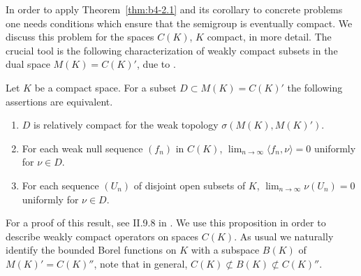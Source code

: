 In order to apply Theorem~\ref{thm:b4-2.1} and its corollary to concrete problems one
needs conditions which ensure that the semigroup is eventually compact.
We discuss this problem for the spaces $C(K)$, $K$ compact, in
more detail.
The crucial tool is the following characterization of
weakly compact subsets in the dual space $M(K) = C(K)'$, due to
\textcite{grothendieck:1953}.

\begin{proposition}\label{prop:b4-2.3}
	Let $K$ be a compact space.
	For a subset $D \subset M(K) = C(K)'$ the following assertions are equivalent.
	
	\begin{enumerate}[\upshape (a)]
		\item 
		$D$ is relatively compact for the weak topology $\sigma(M(K),M(K)')$.
	
		\item 
		For each weak null sequence $(f_n)$ in $C(K)$, $\lim_{n\to\infty}\langle f_n,\nu \rangle = 0$ uniformly for $\nu \in D$.
	
		\item 
		For each sequence $(U_n)$ of disjoint open subsets of\/ $K$, 
		$\lim_{n\to\infty}\nu(U_n) = 0$ uniformly for $\nu \in D$.
		\end{enumerate}
\end{proposition}
For a proof of this result, see \eg II.9.8 in \textcite{schaefer:1974}.
We use this proposition in order to describe weakly compact operators on spaces $C(K)$.
As usual we naturally identify the bounded Borel functions on $K$ with a subspace $B(K)$ of\/ $M(K)' = C(K)''$, note that in
general, $C(K) \not\subset B(K) \not\subset C(K)''$.

